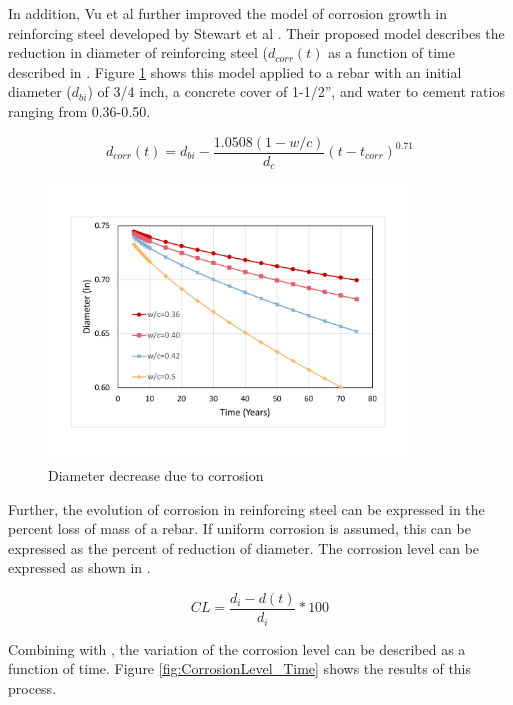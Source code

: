 In addition, Vu et al  further improved the model of corrosion growth in reinforcing steel developed by Stewart et al \cite{Vu2000}\cite{Stewart1998}\cite{Choe2008}\cite{Ghosh2010}. Their proposed model describes the reduction in diameter of reinforcing steel ($d_{corr}(t)$ as a function of time described in . Figure \ref{fig:DiameterEvolution} shows this model applied to a rebar with an initial diameter ($d_{bi}$) of 3/4 inch, a concrete cover of 1-1/2”, and water to cement ratios ranging from 0.36-0.50.

\begin{equation}
  d_{corr}(t)=d_{bi}-\frac{1.0508(1-w/c)}{d_c} (t-t_{corr})^{0.71}
  \label{eq.CorrosionEvolution}
\end{equation} 

\begin{figure}[htbp]
\centering
\includegraphics[width=0.85\textwidth]{Chapter-2/figs/DiameterDecrease}
\caption{Diameter decrease due to corrosion}
\label{fig:DiameterEvolution}
\end{figure}

Further, the evolution of corrosion in reinforcing steel can be expressed in the percent loss of mass of a rebar. If uniform corrosion is assumed, this can be expressed as the percent of reduction of diameter. The corrosion level can be expressed as shown in .

\begin{equation}
	CL=\frac{d_{i}-d(t)}{d_{i}}*100%
  \label{eq.CorrosionLevel}
\end{equation} 

Combining  with ,  the variation of the corrosion level can be described as a function of time. Figure  \ref{fig:CorrosionLevel_Time} shows the results of this process.

